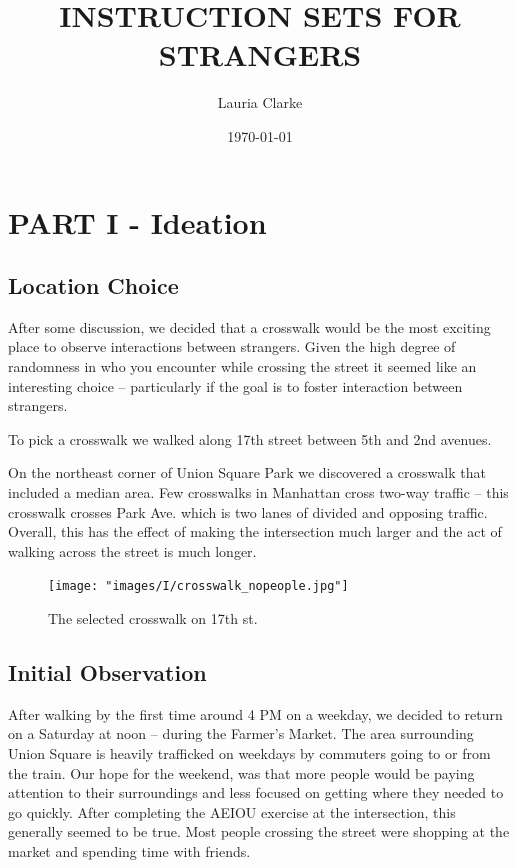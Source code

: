\documentclass[11pt]{report}
\title{INSTRUCTION SETS FOR STRANGERS}
\date{\today}
\author{Lauria Clarke}
\begin{document}
\maketitle
\section*{PART I - Ideation}
\subsection*{Location Choice}

After some discussion, we decided that a crosswalk would be the most exciting place to observe interactions between strangers. Given the high degree of randomness in who you encounter while crossing the street it seemed like an interesting choice -- particularly if the goal is to foster interaction between strangers. 

To pick a crosswalk we walked along 17th street between 5th and 2nd avenues. 

On the northeast corner of Union Square Park we discovered a crosswalk that included a median area. Few crosswalks in Manhattan cross two-way traffic -- this crosswalk crosses Park Ave. which is two lanes of divided and opposing traffic. Overall, this has the effect of making the intersection much larger and the act of walking across the street is much longer. 

\begin{figure}[ht]
\centering
\texttt{[image: "images/I/crosswalk\_nopeople.jpg"]}
\caption{The selected crosswalk on 17th st.}
\label{fig:nopeople}
\end{figure}


\subsection*{Initial Observation}

After walking by the first time around 4 PM on a weekday, we decided to return on a Saturday at noon -- during the Farmer's Market. The area surrounding Union Square is heavily trafficked on weekdays by commuters going to or from the train. Our hope for the weekend, was that more people would be paying attention to their surroundings and less focused on getting where they needed to go quickly. After completing the AEIOU exercise at the intersection, this generally seemed to be true. Most people crossing the street were shopping at the market and spending time with friends. 
\end{document}
